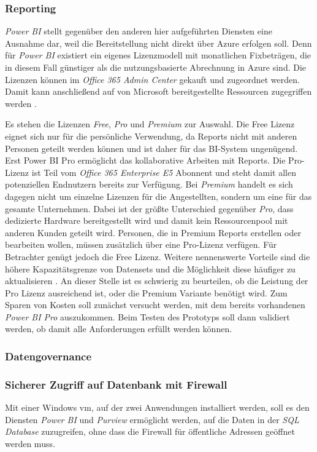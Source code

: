 \subsubsection{Reporting} \label{subsec:infra:konfig:powerbi}
\textit{Power BI} stellt gegenüber den anderen hier aufgeführten Diensten eine Ausnahme dar, weil die Bereitstellung nicht direkt über Azure erfolgen soll. Denn für  \textit{Power BI} existiert ein eigenes Lizenzmodell mit monatlichen Fixbeträgen, die in diesem Fall günstiger als die nutzungsbasierte Abrechnung in Azure sind. Die Lizenzen können im \textit{Office 365 Admin Center} gekauft und zugeordnet werden. Damit kann anschließend auf von Microsoft bereitgestellte Ressourcen zugegriffen werden \cite[vgl.][]{gunnarsson_pro_2020}.

Es stehen die Lizenzen \textit{Free}, \textit{Pro} und \textit{Premium} zur Auswahl. Die Free Lizenz eignet sich nur für die persönliche Verwendung, da Reports nicht mit anderen Personen geteilt werden können und ist daher für das BI-System ungenügend. Erst Power BI Pro ermöglicht das kollaborative Arbeiten mit Reports. Die Pro-Lizenz ist Teil vom \textit{Office 365 Enterprise E5} Abonnent und steht damit allen potenziellen Endnutzern bereits zur Verfügung. Bei \textit{Premium} handelt es sich dagegen nicht um einzelne Lizenzen für die Angestellten, sondern um eine für das gesamte Unternehmen. Dabei ist der größte Unterschied gegenüber \textit{Pro}, dass dedizierte Hardware bereitgestellt wird und damit kein Ressourcenpool mit anderen Kunden geteilt wird. Personen, die in Premium Reports erstellen oder bearbeiten wollen, müssen zusätzlich über eine Pro-Lizenz verfügen. Für Betrachter genügt jedoch die Free Lizenz. Weitere nennenswerte Vorteile sind die höhere Kapazitätsgrenze von Datensets und die Möglichkeit diese häufiger zu aktualisieren \cite[vgl.][]{gunnarsson_pro_2020}. An dieser Stelle ist es schwierig zu beurteilen, ob die Leistung der Pro Lizenz ausreichend ist, oder die Premium Variante benötigt wird. Zum Sparen von Kosten soll zunächst versucht werden, mit dem bereits vorhandenen \textit{Power BI Pro} auszukommen. Beim Testen des Prototyps soll dann validiert werden, ob damit alle Anforderungen erfüllt werden können.

\subsubsection{Datengovernance} \label{subsec:infra:konfig:purview}

\subsubsection{Sicherer Zugriff auf Datenbank mit Firewall} \label{subsec:infra:konfig:purview}
Mit einer Windows \ac{vm}, auf der zwei Anwendungen installiert werden, soll es den Diensten \textit{Power BI} und \textit{Purview} ermöglicht werden, auf die Daten in der \textit{SQL Database} zuzugreifen, ohne dass die Firewall für öffentliche Adressen geöffnet werden muss. 

